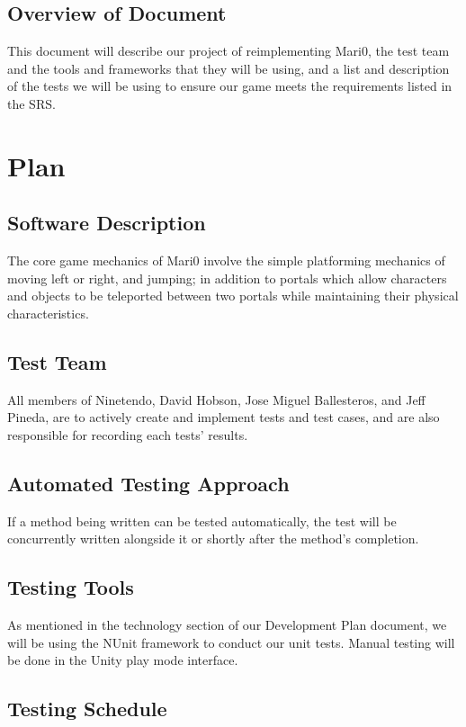\documentclass[12pt, titlepage]{article}
\begin{document}
\subsection{Overview of Document}
	This document will describe our project of reimplementing Mari0, the test team and the tools and frameworks that they will be using, and a list and description of the tests we will be using to ensure our game meets the requirements listed in the SRS.
\section{Plan}
	
\subsection{Software Description}
The core game mechanics of Mari0 involve the simple platforming mechanics of moving left or right, and jumping; in addition to portals which allow characters and objects to be teleported between two portals while maintaining their physical characteristics.
\subsection{Test Team}
All members of Ninetendo, David Hobson, Jose Miguel Ballesteros, and Jeff Pineda, are to actively create and implement tests and test cases, and are also responsible for recording each tests' results.
\subsection{Automated Testing Approach}
If a method being written can be tested automatically, the test will be concurrently written alongside it or shortly after the method's completion. 
\subsection{Testing Tools}
As mentioned in the technology section of our Development Plan document, we will be using the NUnit framework to conduct our unit tests. Manual testing will be done in the Unity play mode interface.
\subsection{Testing Schedule}
\end{document}
